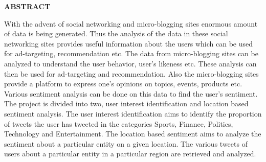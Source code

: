\thispagestyle{empty}
\begin{center}	
	\textbf{\Large ABSTRACT}\\
\end{center}
\vspace{2cm}
\begin{comment}
\par
Social media plays a big role in our day-to day lives. Automatic identification of user interest from social media has gained much attention in the recent years. Over the last few years, micro-blogging services like Twitter have become a great source of information from friends, celebrities, organizations and a means for building social networks. In Twitter, users could post tweets about a wide range of topics. These tweets could be analyzed to identify the user’s interests, which could be used to personalize recommendations for that user.These services are being increasingly used for real-time information sharing, news and recommendations.
This report describes the creation, implementation and evaluation of a classifier, trained using supervised machine learning techniques, which takes tweets of a person as input, and classifies them into a set of predefined categories. These categories are Sports, Finance, Technology and Entertainment. The report also explains location-based tweet analysis on products or events which provide positive,negative and neutral tweets and also gives the percentage of each of it. 
It  discusses the goals , the necessary data collected to train and test the classifier.The polarity of each word is assigned and it is used in product analysis . The
output of the classifier and the product analyzer are shown with the help of an  interface. 
\hfill
\end{comment}
With the advent of social networking and micro-blogging sites enormous amount of data is being generated. Thus the analysis of the data in these social networking sites provides useful information about the users which can be used for ad-targeting, recommendation etc. The data from micro-blogging sites can be analyzed to understand the user behavior, user’s likeness etc. These analysis can then be used for ad-targeting and recommendation. Also the micro-blogging sites provide a platform to express one’s opinions on topics, events, products etc. Various sentiment analysis can be done on this data to find the user’s  sentiment.
\\
The project is divided into two, user interest identification and location based sentiment analysis. The user interest identification aims to identify the proportion of tweets the user has tweeted in the categories Sports, Finance, Politics, Technology and Entertainment. The location based sentiment aims to analyze the sentiment about a particular entity on a given location. The various tweets of users about a particular entity in a particular region are retrieved and analyzed.